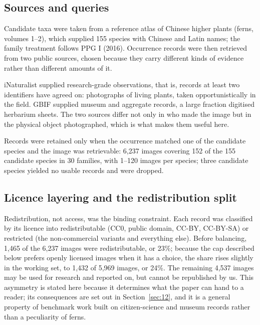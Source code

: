 \documentclass[preprint,12pt,authoryear]{elsarticle}
\begin{document}
\setcounter{section}{3}

\setcounter{subsection}{0}

\subsection{Sources and queries}\label{sec:3.1}

Candidate taxa were taken from a reference atlas of Chinese higher plants (ferns, volumes 1--2), which supplied 155 species with Chinese and Latin names; the family treatment follows PPG I (2016). Occurrence records were then retrieved from two public sources, chosen because they carry different kinds of evidence rather than different amounts of it.

iNaturalist supplied research-grade observations, that is, records at least two identifiers have agreed on: photographs of living plants, taken opportunistically in the field. GBIF \citep{gbifsecretariat2023} supplied museum and aggregate records, a large fraction digitised herbarium sheets. The two sources differ not only in who made the image but in the physical object photographed, which is what makes them useful here.

Records were retained only when the occurrence matched one of the candidate species and the image was retrievable: 6,237 images covering 152 of the 155 candidate species in 30 families, with 1--120 images per species; three candidate species yielded no usable records and were dropped.

\setcounter{section}{3}

\setcounter{subsection}{1}

\subsection{Licence layering and the redistribution split}\label{sec:3.2}

Redistribution, not access, was the binding constraint. Each record was classified by its licence into redistributable (CC0, public domain, CC-BY, CC-BY-SA) or restricted (the non-commercial variants and everything else). Before balancing, 1,465 of the 6,237 images were redistributable, or 23\%; because the cap described below prefers openly licensed images when it has a choice, the share rises slightly in the working set, to 1,432 of 5,969 images, or 24\%. The remaining 4,537 images may be used for research and reported on, but cannot be republished by us. This asymmetry is stated here because it determines what the paper can hand to a reader; its consequences are set out in Section~\ref{sec:12}, and it is a general property of benchmark work built on citizen-science and museum records rather than a peculiarity of ferns.
\end{document}
